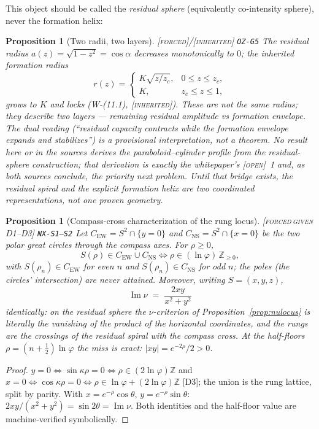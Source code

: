 \documentclass[11pt]{article}
\newcommand{\tagF}{\textcolor{cF}{\textsc{[forced]}}}
\newcommand{\tagFD}{\textcolor{cF}{\textsc{[forced}}\,\textcolor{cD}{\textsc{given D1--D3]}}}
\newcommand{\tagI}{\textcolor{cI}{\textsc{[inherited]}}}
\newcommand{\tagO}{\textcolor{cO}{\textsc{[open]}}}
\newcommand{\hx}[1]{\textcolor{cC}{\footnotesize\texttt{#1}}}
\newcommand{\Z}{\mathbb{Z}}
\newcommand{\gp}{\varphi}
\theoremstyle{plain}
\newtheorem{proposition}[theorem]{Proposition}
\theoremstyle{definition}
\theoremstyle{remark}
\begin{document}
This object should be called the \emph{residual sphere} (equivalently
co-intensity sphere), never the formation helix:

\begin{proposition}[Two radii, two layers]\label{prop:tworadii}\tagF{}/\tagI{} \hx{OZ-G5}
The residual radius $a(z)=\sqrt{1-z^2}=\cos\alpha$ decreases monotonically to
$0$; the inherited formation radius
\[
r(z)=\begin{cases}K\sqrt{z/z_c},&0\le z\le z_c,\\ K,&z_c\le z\le1,\end{cases}
\]
grows to $K$ and locks (W-(11.1), \tagI{}).
These are \emph{not} the same radius; they describe two layers ---
remaining residual amplitude vs formation envelope. The dual reading
(``residual capacity contracts while the formation envelope expands and
stabilizes'') is a provisional interpretation, not a theorem. No result here or
in the sources derives the paraboloid--cylinder profile from the residual-sphere
construction; that derivation is exactly the whitepaper's \tagO{}~1 and, as both
sources conclude, the priority next problem. Until that bridge exists, the
residual spiral and the explicit formation helix are two coordinated
representations, not one proven geometry.
\end{proposition}

\begin{proposition}[Compass-cross characterization of the rung locus]\label{prop:compasscross}\tagFD{} \hx{NX-S1--S2}
Let $C_{\mathrm{EW}}=S^2\cap\{y=0\}$ and $C_{\mathrm{NS}}=S^2\cap\{x=0\}$
be the two polar great circles through the compass axes. For $\rho\ge0$,
\[
S(\rho)\in C_{\mathrm{EW}}\cup C_{\mathrm{NS}}
\iff \rho\in(\ln\gp)\,\Z_{\ge0},
\]
with $S(\rho_n)\in C_{\mathrm{EW}}$ for even $n$ and
$S(\rho_n)\in C_{\mathrm{NS}}$ for odd $n$; the poles (the circles'
intersection) are never attained. Moreover, writing $S=(x,y,z)$,
\[
\operatorname{Im}\nu \;=\; \frac{2xy}{x^2+y^2}
\]
identically: on the residual sphere the $\nu$-criterion of
Proposition~\ref{prop:nulocus} is literally the vanishing of the product of
the horizontal coordinates, and the rungs are the crossings of the residual
spiral with the compass cross. At the half-floors $\rho=(n+\tfrac12)\ln\gp$
the miss is exact: $|xy|=e^{-2\rho}/2>0$.
\end{proposition}

\begin{proof}
$y=0\iff\sin\kappa\rho=0\iff\rho\in(2\ln\gp)\Z$ and
$x=0\iff\cos\kappa\rho=0\iff\rho\in\ln\gp+(2\ln\gp)\Z$ [D3]; the union
is the rung lattice, split by parity. With $x=e^{-\rho}\cos\theta$,
$y=e^{-\rho}\sin\theta$: $2xy/(x^2+y^2)=\sin2\theta=\operatorname{Im}\nu$.
Both identities and the half-floor value are machine-verified symbolically.
\end{proof}
\end{document}
